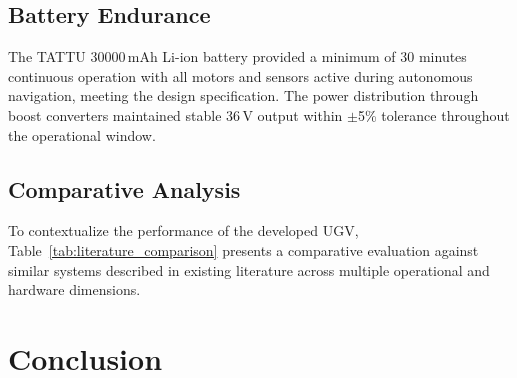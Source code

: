 \documentclass[runningheads]{llncs}
\begin{document}
\subsection{Battery Endurance}

The TATTU 30000\,mAh Li-ion battery provided a minimum of 30 minutes continuous operation with all motors and sensors active during autonomous navigation, meeting the design specification. The power distribution through boost converters maintained stable 36\,V output within $\pm$5\% tolerance throughout the operational window.

\subsection{Comparative Analysis}

To contextualize the performance of the developed UGV, Table~\ref{tab:literature_comparison} presents a comparative evaluation against similar systems described in existing literature across multiple operational and hardware dimensions.

\begin{table}[htbp]
\caption{Performance Comparison with Existing Literature}
\label{tab:literature_comparison}
\centering
{}
\end{table}

\section{Conclusion}
\label{sec:conclusion}
\end{document}
